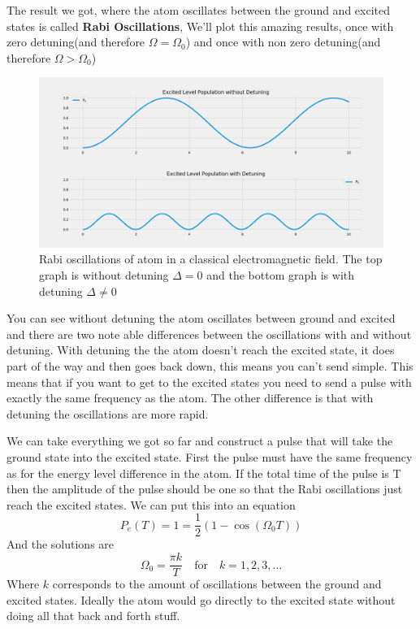 \documentclass[english, a4paper, 12pt, twoside]{article}
\numberwithin{equation}{section} %
\begin{document}
The result we got, where the atom oscillates between the ground and excited states is called \textbf{Rabi Oscillations}, We'll plot this amazing results, once with zero detuning(and therefore $\Omega = \Omega_0$) and once with non zero detuning(and therefore $\Omega > \Omega_0$)
\begin{figure}[H]
    \centering
    \includegraphics[width=1.0\columnwidth]{Rabi-Oscillations.png}
    \caption{Rabi oscillations of atom in a classical electromagnetic field. The top graph is without detuning $\Delta = 0$ and the bottom graph is with detuning $\Delta \ne 0$}
    \label{fig:rabi-oscillations}
\end{figure}
You can see without detuning the atom oscillates between ground and excited and there are two note able differences between the oscillations with and without detuning. With detuning the the atom doesn't reach the excited state, it does part of the way and then goes back down, this means you can't send simple. This means that if you want  to get to the excited states you need to send a pulse with exactly the same frequency as the atom. The other difference is that with detuning the oscillations are more rapid.

We can take everything we got so far and construct a pulse that will take the ground state into the excited state. First the pulse must have the same frequency as for the energy level difference in the atom. If the total time of the pulse is T then the amplitude of the pulse should be one so that the Rabi oscillations just reach the excited states. We can put this into an equation
\[
    P_e(T) = 1 = \frac{1}{2}(1 - \cos (\Omega_0 T))
\]
And the solutions are
\[
    \Omega_0 = \frac{\pi k}{T} \quad \text{for} \quad k = 1, 2, 3, \dots
\]
Where $k$ corresponds to the amount of oscillations between the ground and excited states. Ideally the atom would go directly to the excited state without doing all that back and forth stuff.
\end{document}

